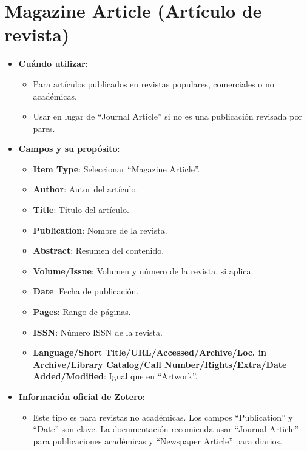 \documentclass[
  jou,
  floatsintext,
  longtable,
  a4paper,
  nolmodern,
  notxfonts,
  notimes,
  12pt,
  colorlinks=true,linkcolor=blue,citecolor=blue,urlcolor=blue]{apa7}
\providecommand{\tightlist}{%
  \setlength{\itemsep}{0pt}\setlength{\parskip}{0pt}}
\begin{document}
\section{Magazine Article (Artículo de
revista)}\label{magazine-article-artuxedculo-de-revista}

\begin{itemize}
\tightlist
\item
  \textbf{Cuándo utilizar}:

  \begin{itemize}
  \tightlist
  \item
    Para artículos publicados en revistas populares, comerciales o no
    académicas.
  \item
    Usar en lugar de ``Journal Article'' si no es una publicación
    revisada por pares.
  \end{itemize}
\item
  \textbf{Campos y su propósito}:

  \begin{itemize}
  \tightlist
  \item
    \textbf{Item Type}: Seleccionar ``Magazine Article''.
  \item
    \textbf{Author}: Autor del artículo.
  \item
    \textbf{Title}: Título del artículo.
  \item
    \textbf{Publication}: Nombre de la revista.
  \item
    \textbf{Abstract}: Resumen del contenido.
  \item
    \textbf{Volume/Issue}: Volumen y número de la revista, si aplica.
  \item
    \textbf{Date}: Fecha de publicación.
  \item
    \textbf{Pages}: Rango de páginas.
  \item
    \textbf{ISSN}: Número ISSN de la revista.
  \item
    \textbf{Language/Short Title/URL/Accessed/Archive/Loc. in
    Archive/Library Catalog/Call Number/Rights/Extra/Date
    Added/Modified}: Igual que en ``Artwork''.
  \end{itemize}
\item
  \textbf{Información oficial de Zotero}:

  \begin{itemize}
  \tightlist
  \item
    Este tipo es para revistas no académicas. Los campos ``Publication''
    y ``Date'' son clave. La documentación recomienda usar ``Journal
    Article'' para publicaciones académicas y ``Newspaper Article'' para
    diarios.
  \end{itemize}
\end{itemize}
\end{document}
